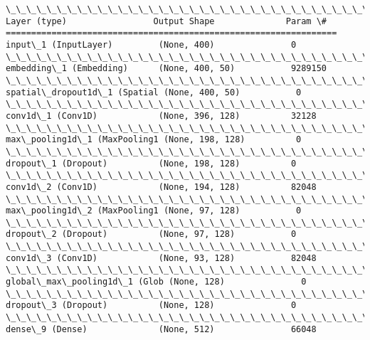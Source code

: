 \documentclass[11pt]{article}
\begin{document}
\begin{Verbatim}[commandchars=\\\{\}]
\_\_\_\_\_\_\_\_\_\_\_\_\_\_\_\_\_\_\_\_\_\_\_\_\_\_\_\_\_\_\_\_\_\_\_\_\_\_\_\_\_\_\_\_\_\_\_\_\_\_\_\_\_\_\_\_\_\_\_\_\_\_\_\_\_
Layer (type)                 Output Shape              Param \#
=================================================================
input\_1 (InputLayer)         (None, 400)               0
\_\_\_\_\_\_\_\_\_\_\_\_\_\_\_\_\_\_\_\_\_\_\_\_\_\_\_\_\_\_\_\_\_\_\_\_\_\_\_\_\_\_\_\_\_\_\_\_\_\_\_\_\_\_\_\_\_\_\_\_\_\_\_\_\_
embedding\_1 (Embedding)      (None, 400, 50)           9289150
\_\_\_\_\_\_\_\_\_\_\_\_\_\_\_\_\_\_\_\_\_\_\_\_\_\_\_\_\_\_\_\_\_\_\_\_\_\_\_\_\_\_\_\_\_\_\_\_\_\_\_\_\_\_\_\_\_\_\_\_\_\_\_\_\_
spatial\_dropout1d\_1 (Spatial (None, 400, 50)           0
\_\_\_\_\_\_\_\_\_\_\_\_\_\_\_\_\_\_\_\_\_\_\_\_\_\_\_\_\_\_\_\_\_\_\_\_\_\_\_\_\_\_\_\_\_\_\_\_\_\_\_\_\_\_\_\_\_\_\_\_\_\_\_\_\_
conv1d\_1 (Conv1D)            (None, 396, 128)          32128
\_\_\_\_\_\_\_\_\_\_\_\_\_\_\_\_\_\_\_\_\_\_\_\_\_\_\_\_\_\_\_\_\_\_\_\_\_\_\_\_\_\_\_\_\_\_\_\_\_\_\_\_\_\_\_\_\_\_\_\_\_\_\_\_\_
max\_pooling1d\_1 (MaxPooling1 (None, 198, 128)          0
\_\_\_\_\_\_\_\_\_\_\_\_\_\_\_\_\_\_\_\_\_\_\_\_\_\_\_\_\_\_\_\_\_\_\_\_\_\_\_\_\_\_\_\_\_\_\_\_\_\_\_\_\_\_\_\_\_\_\_\_\_\_\_\_\_
dropout\_1 (Dropout)          (None, 198, 128)          0
\_\_\_\_\_\_\_\_\_\_\_\_\_\_\_\_\_\_\_\_\_\_\_\_\_\_\_\_\_\_\_\_\_\_\_\_\_\_\_\_\_\_\_\_\_\_\_\_\_\_\_\_\_\_\_\_\_\_\_\_\_\_\_\_\_
conv1d\_2 (Conv1D)            (None, 194, 128)          82048
\_\_\_\_\_\_\_\_\_\_\_\_\_\_\_\_\_\_\_\_\_\_\_\_\_\_\_\_\_\_\_\_\_\_\_\_\_\_\_\_\_\_\_\_\_\_\_\_\_\_\_\_\_\_\_\_\_\_\_\_\_\_\_\_\_
max\_pooling1d\_2 (MaxPooling1 (None, 97, 128)           0
\_\_\_\_\_\_\_\_\_\_\_\_\_\_\_\_\_\_\_\_\_\_\_\_\_\_\_\_\_\_\_\_\_\_\_\_\_\_\_\_\_\_\_\_\_\_\_\_\_\_\_\_\_\_\_\_\_\_\_\_\_\_\_\_\_
dropout\_2 (Dropout)          (None, 97, 128)           0
\_\_\_\_\_\_\_\_\_\_\_\_\_\_\_\_\_\_\_\_\_\_\_\_\_\_\_\_\_\_\_\_\_\_\_\_\_\_\_\_\_\_\_\_\_\_\_\_\_\_\_\_\_\_\_\_\_\_\_\_\_\_\_\_\_
conv1d\_3 (Conv1D)            (None, 93, 128)           82048
\_\_\_\_\_\_\_\_\_\_\_\_\_\_\_\_\_\_\_\_\_\_\_\_\_\_\_\_\_\_\_\_\_\_\_\_\_\_\_\_\_\_\_\_\_\_\_\_\_\_\_\_\_\_\_\_\_\_\_\_\_\_\_\_\_
global\_max\_pooling1d\_1 (Glob (None, 128)               0
\_\_\_\_\_\_\_\_\_\_\_\_\_\_\_\_\_\_\_\_\_\_\_\_\_\_\_\_\_\_\_\_\_\_\_\_\_\_\_\_\_\_\_\_\_\_\_\_\_\_\_\_\_\_\_\_\_\_\_\_\_\_\_\_\_
dropout\_3 (Dropout)          (None, 128)               0
\_\_\_\_\_\_\_\_\_\_\_\_\_\_\_\_\_\_\_\_\_\_\_\_\_\_\_\_\_\_\_\_\_\_\_\_\_\_\_\_\_\_\_\_\_\_\_\_\_\_\_\_\_\_\_\_\_\_\_\_\_\_\_\_\_
dense\_9 (Dense)              (None, 512)               66048

\end{Verbatim}
\end{document}
